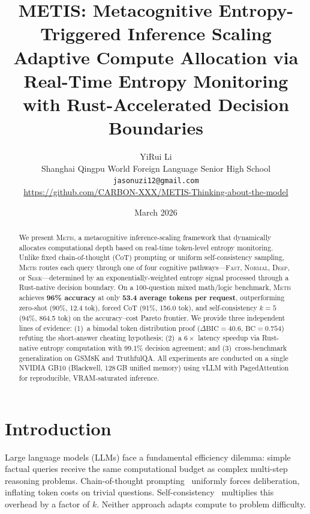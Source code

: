 \documentclass[11pt,a4paper]{article}
\title{%
    \textbf{METIS: Metacognitive Entropy-Triggered Inference Scaling}\\[6pt]
    \large Adaptive Compute Allocation via Real-Time Entropy Monitoring\\
    with Rust-Accelerated Decision Boundaries
}
\author{%
    YiRui Li \\
    Shanghai Qingpu World Foreign Language Senior High School \\
    \texttt{jasonuzi12@gmail.com} \\[4pt]
    \url{https://github.com/CARBON-XXX/METIS-Thinking-about-the-model}
}
\date{March 2026}
\newcommand{\metis}{\textsc{Metis}}
\begin{document}
\maketitle

\begin{abstract}
We present \metis{}, a metacognitive inference-scaling framework that dynamically allocates computational depth based on real-time token-level entropy monitoring. Unlike fixed chain-of-thought (CoT) prompting or uniform self-consistency sampling, \metis{} routes each query through one of four cognitive pathways---\textsc{Fast}, \textsc{Normal}, \textsc{Deep}, or \textsc{Seek}---determined by an exponentially-weighted entropy signal processed through a Rust-native decision boundary. On a 100-question mixed math/logic benchmark, \metis{} achieves \textbf{96\% accuracy} at only \textbf{53.4 average tokens per request}, outperforming zero-shot (90\%, 12.4 tok), forced CoT (91\%, 156.0 tok), and self-consistency $k{=}5$ (94\%, 864.5 tok) on the accuracy--cost Pareto frontier. We provide three independent lines of evidence: (1)~a bimodal token distribution proof ($\Delta\text{BIC}=40.6$, $\text{BC}=0.754$) refuting the short-answer cheating hypothesis; (2)~a $6\times$ latency speedup via Rust-native entropy computation with 99.1\% decision agreement; and (3)~cross-benchmark generalization on GSM8K and TruthfulQA. All experiments are conducted on a single NVIDIA GB10 (Blackwell, 128\,GB unified memory) using vLLM with PagedAttention for reproducible, VRAM-saturated inference.
\end{abstract}

\section{Introduction}
\label{sec:intro}

Large language models (LLMs) face a fundamental efficiency dilemma: simple factual queries receive the same computational budget as complex multi-step reasoning problems. Chain-of-thought prompting~\citep{wei2022chain} uniformly forces deliberation, inflating token costs on trivial questions. Self-consistency~\citep{wang2022self} multiplies this overhead by a factor of $k$. Neither approach adapts compute to problem difficulty.
\end{document}
